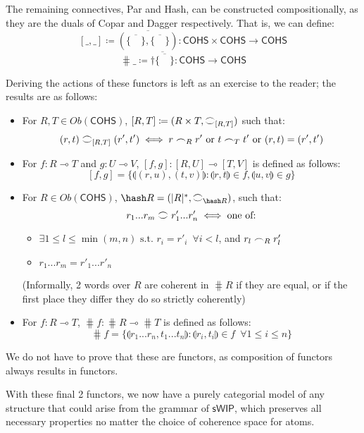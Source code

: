 \documentclass[12pt, oneside]{article}
\theoremstyle{plain}
\theoremstyle{definition}
\let\originaldagger\dagger
\renewcommand{\dag}{\mathord{\originaldagger}}
\newcommand{\lp}{\llparenthesis}
\newcommand{\rp}{\rrparenthesis}
\newcommand{\sSys}{{\mathsf{sWIP}}}%
\newcommand{\cohs}{{\mathsf{COHS}}}
\newcommand{\coh}[1][]{\mathrel{\vcenter{\offinterlineskip\hbox{$\frown$}\vskip0.2ex\hbox{$\smile$}}_{\ifx\\#1\\\else#1\fi}}}
\newcommand{\scoh}[1][]{\mathrel{\frown}_{\ifx\\#1\\\else#1\fi}}
\begin{document}
The remaining connectives, Par and Hash, can be constructed compositionally, as they are the duals of Copar and Dagger respectively.
That is, we can define:
$$[\_,\_]\coloneqq\overline{(\overline{\{\quad\}},\overline{\{\quad\}})}:\cohs\times\cohs\to\cohs$$
$$\hash \_\coloneqq\overline{\dag\overline{\{\quad\}}}:\cohs\to\cohs$$

Deriving the actions of these functors is left as an exercise to the reader; the results are as follows:

\begin{itemize}
    \item
    For $R,T\in Ob(\cohs)$, $[R,T] \coloneqq (R\times T,\coh[{[R,T]}])$ such that:
    $$(r,t)\coh[{[R,T]}](r',t')\iff r\scoh[R]r'\text{ or }t\scoh[T]t'\text{ or }(r,t)=(r',t')$$

    \item
    For $f:R\multimap T$ and $g:U\multimap V$, 
    $[f,g]:[R,U]\multimap[T,V]$ is defined as follows:
    $$[f,g]=\{\lp(r,u),(t,v)\rp:\lp r,t\rp\in f,\lp u,v\rp\in g\}$$

    \item
        For $R\in Ob(\cohs)$, $\hash R=(|R|^*,\coh[\hash R])$, such that:
        $$r_1...r_m \coh r'_1...r'_n \iff \text{one of:}$$

        \begin{itemize}
            \item
            $\exists 1\leq l \leq \min(m,n) \text{ s.t. } r_i=r'_i \enspace\forall i<l$, and $r_l \scoh[R] r'_l$

            \item
            $r_1...r_m=r'_1...r'_n$
        \end{itemize}

        (Informally, 2 words over $R$ are coherent in $\hash R$ if they are equal, or if the first place they differ they do so strictly coherently)

        \item
        For $f:R\multimap T$, $\hash f:\hash R\multimap\hash T$ is defined as follows:
        $$\hash f=\{\lp r_1...r_n,t_1...t_n\rp:\lp r_i,t_i\rp\in f\enspace\forall 1\le i\le n\}$$
\end{itemize}

We do not have to prove that these are functors, as composition of functors always results in functors.

With these final 2 functors, we now have a purely categorial model of any structure that could arise from the grammar of $\sSys$, which preserves all necessary properties no matter the choice of coherence space for atoms.
\end{document}
